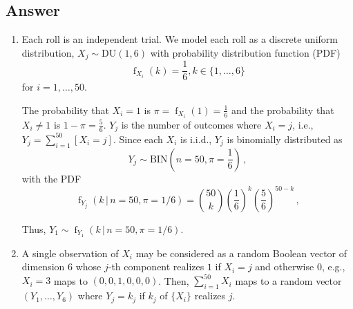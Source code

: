 \documentclass[12pt]{fphw}[final]
\begin{document}
\subsection*{Answer}
\begin{enumerate} %
	\item Each roll is an independent trial. We model each roll as a discrete uniform distribution, $X_j \sim \mathrm{DU}(1,6)$ with probability distribution function (PDF)
	\begin{equation}
		\operatorname{f}_{X_i}(k) = \frac{1}{6}, k \in \{1,\ldots,6\}
	\end{equation}
    for $i=1,\ldots,50$.
	
	The probability that $X_i = 1$ is $\pi = \operatorname{f}_{X_i}(1) = \frac{1}{6}$ and the probability that $X_i \neq 1$ is $1-\pi = \frac{5}{6}$.
	$Y_j$ is the number of outcomes where $X_i = j$, i.e., $Y_j = \sum_{i=1}^{50} [X_i = j]$. Since each $X_i$ is i.i.d., $Y_j$ is binomially distributed as
	\begin{equation}
		Y_j \sim \mathrm{BIN}\left(n = 50, \pi = \frac{1}{6}\right)\,,
	\end{equation}
	with the PDF
	\begin{equation}
		\operatorname{f}_{Y_j}(k \,\vert\, n = 50, \pi = 1/6) = {50 \choose k} \left(\frac{1}{6}\right)^k \left(\frac{5}{6}\right)^{50-k}\,,
	\end{equation}
    
    Thus, $Y_1 \sim \operatorname{f}_{Y_1}(k \, \vert \, n = 50, \pi = 1/6 )$.
    
	
	\item A single observation of $X_i$ may be considered as a random Boolean vector of dimension $6$ whose
    $j$-th component realizes $1$ if $X_i = j$ and otherwise $0$, e.g., $X_i = 3$ maps to $(0,0,1,0,0,0)$.
    Then, $\sum_{i=1}^{50} X_i$ maps to a random vector $(Y_1,\ldots,Y_6)$ where $Y_j = k_j$ if $k_j$ of $\{X_i\}$ realizes $j$.
    

\end{enumerate}
\end{document}
